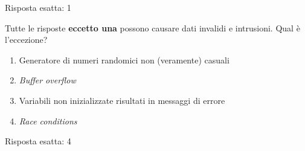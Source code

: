 \begin{Answer} [
  ref={esControlli10},
  number={10}
  ]

  \Question Risposta esatta: 1
\end{Answer}


\begin{Exercise} [
  title={Quiz},
  label={esControlli11}
  ]

  \Question Tutte le risposte \textbf{eccetto una} possono causare dati
  invalidi e intrusioni. Qual è l'eccezione?
\begin{enumerate}
 \item Generatore di numeri randomici non (veramente) casuali
 \item \textit{Buffer overflow}
 \item Variabili non inizializzate risultati in messaggi di errore
 \item \textit{Race conditions}
\end{enumerate}

\end{Exercise}

\begin{Answer} [
  ref={esControlli11},
  number={11}
  ]

  \Question Risposta esatta: 4
\end{Answer}
